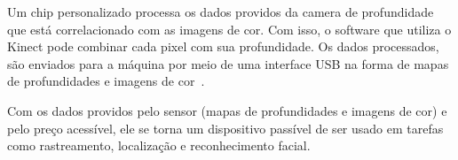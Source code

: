Um chip personalizado processa os dados providos da camera de profundidade que está correlacionado com as imagens de cor. Com isso, o software que utiliza o Kinect pode combinar cada pixel com sua profundidade. Os dados processados, são enviados para a máquina por meio de uma interface USB na forma de mapas de profundidades e imagens de cor~\cite{kinect}.

Com os dados providos pelo sensor (mapas de profundidades e imagens de cor) e pelo preço acessível, ele se torna um dispositivo passível de ser usado em tarefas como rastreamento, localização e reconhecimento facial.
